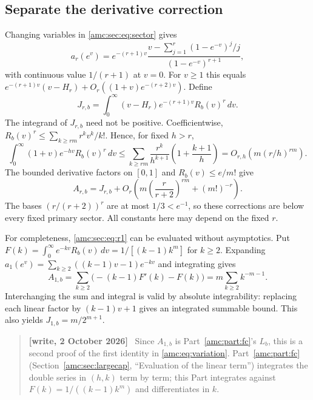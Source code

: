\documentclass[11pt,letterpaper]{article}
\theoremstyle{remark}\newtheorem{remark}[theorem]{Remark}
\newenvironment{writenote}{\par\smallskip\begin{quote}\small\textbf{[write, 2 October 2026]}\ }{\end{quote}\smallskip}
\begin{document}
\subsection{Separate the derivative correction}
Changing variables in \eqref{amc:sec:eq:sector} gives
\begin{equation}\label{amc:sec:eq:derivative}
 a_r(e^v)=e^{-(r+1)v}
 \frac{v-\sum_{j=1}^r(1-e^{-v})^j/j}{(1-e^{-v})^{r+1}},
\end{equation}
with continuous value $1/(r+1)$ at $v=0$. For $v\ge1$ this equals
$e^{-(r+1)v}(v-H_r)+O_r((1+v)e^{-(r+2)v})$. Define
\begin{equation}\label{amc:sec:eq:J}
 J_{r,b}=\int_0^\infty(v-H_r)e^{-(r+1)v}R_b(v)^r\,dv.
\end{equation}
The integrand of $J_{r,b}$ need not be positive. Coefficientwise,
$R_b(v)^r\le\sum_{k\ge rm}r^kv^k/k!$. Hence, for fixed $h>r$,
\[
 \int_0^\infty(1+v)e^{-hv}R_b(v)^r\,dv
 \le\sum_{k\ge rm}\frac{r^k}{h^{k+1}}
                  \left(1+\frac{k+1}{h}\right)
 =O_{r,h}\!\left(m(r/h)^{rm}\right).
\]
The bounded derivative factors on $[0,1]$ and $R_b(v)\le e/m!$ give
\begin{equation}\label{amc:sec:eq:derivative-error}
 A_{r,b}=J_{r,b}
 +O_r\!\left(m\left(\frac r{r+2}\right)^{rm}+(m!)^{-r}\right).
\end{equation}
The bases $(r/(r+2))^r$ are at most $1/3<e^{-1}$, so these corrections are below every fixed primary sector. All constants here may depend on the fixed $r$.

For completeness, \eqref{amc:sec:eq:r1} can be evaluated without asymptotics. Put
$F(k)=\int_0^\infty e^{-kv}R_b(v)\,dv=1/[(k-1)k^m]$ for $k\ge2$.
Expanding $a_1(e^v)=\sum_{k\ge2}((k-1)v-1)e^{-kv}$ and integrating gives
\[
 A_{1,b}=\sum_{k\ge2}\bigl(-(k-1)F'(k)-F(k)\bigr)
        =m\sum_{k\ge2}k^{-m-1}.
\]
Interchanging the sum and integral is valid by absolute integrability: replacing each linear factor by $(k-1)v+1$ gives an integrated summable bound. This also yields $J_{1,b}=m/2^{m+1}$.
\begin{writenote}
Since $A_{1,b}$ is Part~\ref{amc:part:fc}'s $L_b$, this is a second proof of the first identity in \eqref{amc:eq:variation}. Part~\ref{amc:part:fc} (Section~\ref{amc:sec:largecap}, ``Evaluation of the linear term'') integrates the double series in $(h,k)$ term by term; this Part integrates against $F(k)=1/((k-1)k^m)$ and differentiates in $k$.
\end{writenote}
\end{document}
